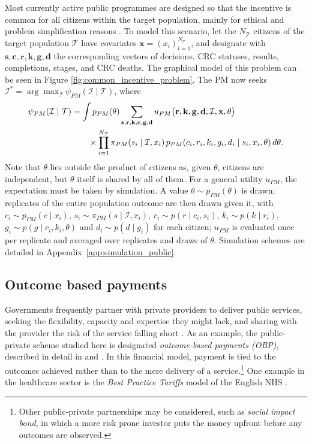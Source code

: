 \documentclass[12pt]{article}
\begin{document}
Most currently active public programmes are designed so that the incentive is common for all citizens within the target population, mainly for ethical and problem simplification reasons \citep{facciorusso2021addition}. To model this scenario, let the $N_{\mathcal{T}}$ citizens of the target population $\mathcal{T}$ have covariates $\mathbf{x} = (x_i)_{i=1}^{N_\mathcal{T}}$, and designate with $\mathbf{s}, \mathbf{c}, \mathbf{r}, \mathbf{k}, \mathbf{g}, \mathbf{d}$ the corresponding vectors of decisions, CRC statuses, results, completions, stages, and CRC deaths. The graphical model of this problem can be seen in Figure \ref{fig:common_incentive_problem}. The PM now seeks $\mathcal{I}^{*} = \arg \max_{\mathcal{I}} \psi_{PM}(\mathcal{I} \mid \mathcal{T})$, where
\begin{align}\label{eq:expected_util_population}
 \psi_{PM}(\mathcal{I} \mid \mathcal{T})
  &= \int p_{PM}(\theta) \sum_{\mathbf{s}, \mathbf{r}, \mathbf{k}, \mathbf{c}, \mathbf{g}, \mathbf{d}}
     u_{PM}\big( \mathbf{r}, \mathbf{k}, \mathbf{g}, \mathbf{d}, \mathcal{I}, \mathbf{x}, \theta \big) \notag \\
  &\qquad \times \prod_{i=1}^{N_{\mathcal{T}}} \pi_{PM}(s_i\mid\mathcal{I}, x_i)\, p_{PM}(c_i, r_i, k_i, g_i, d_i \mid s_i, x_i, \theta)\, d\theta.
\end{align}
Note that $\theta$ lies outside the product of citizens as, given $\theta$, citizens are independent, but $\theta$ itself is shared by all of them. For a general utility $u_{PM}$, the expectation must be taken by simulation. A value $\theta \sim p_{PM}(\theta)$ is drawn; replicates of the entire population outcome are then drawn given it, with $c_i \sim p_{PM}(c \mid x_i)$, $s_i \sim \pi_{PM}(s \mid \mathcal{I}, x_i)$, $r_i \sim p(r \mid c_i, s_i)$, $k_i \sim p(k \mid r_i)$, $g_i \sim p(g \mid c_i, k_i, \theta)$ and $d_i \sim p(d \mid g_i)$ for each citizen; $u_{PM}$ is evaluated once per replicate and averaged over replicates and draws of $\theta$. Simulation schemes are detailed in Appendix~\ref{app:simulation_public}.

 
\subsection{Outcome based payments}\label{sec:OBP}
Governments frequently partner with private providers to deliver public services, seeking the flexibility, capacity and expertise they might lack, and sharing with the provider the risk of the service falling short \citep{roehrich2014public}. As an example, the public-private scheme studied here is designated \emph{outcome-based payments (OBP)}, described in detail in \cite{vlaanderen2019design} and \cite{fox2021evaluating}. In this financial model, payment is tied to the outcomes achieved rather than to the mere delivery of a service.\footnote{Other public-private partnerships may be considered, such as \emph{social impact bond}, in which a more risk prone investor puts the money upfront before any outcomes are observed.} One example in the healthcare sector is the {\em Best Practice Tariffs} model of the English NHS \citep{kristensen2016optimal}.
\end{document}
